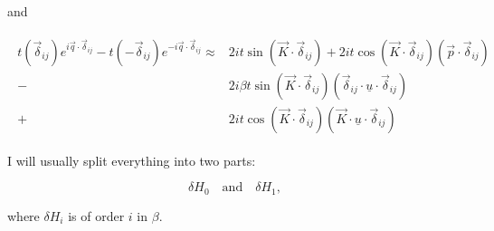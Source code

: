 \documentclass[../../../main.tex]{subfiles}
\begin{document}
and 

\begin{align}
	\begin{split}
		t(\vec{\delta}_{ij})e^{i\vec{q}\cdot\vec{\delta}_{ij}}-t(-\vec{\delta}_{ij})e^{-i\vec{q}\cdot\vec{\delta}_{ij}} \approx & 2it \sin(\vec{K}\cdot\vec{\delta}_{ij}) +2it\cos(\vec{K}\cdot\vec{\delta}_{ij})\left(\vec{p}\cdot\vec{\delta}_{ij}\right) \\
		-&2i\beta t \sin(\vec{K}\cdot\vec{\delta}_{ij})\left(\vec{\delta}_{ij} \cdot \underline{u} \cdot \vec{\delta}_{ij}\right) \\
		+&2it\cos(\vec{K}\cdot\vec{\delta}_{ij})\left(\vec{K}\cdot \underline{u} \cdot \vec{\delta}_{ij}\right)
	\end{split}
\end{align}

I will usually split everything into two parts:

\begin{equation}
	\delta H_0 \quad \text{and} \quad \delta H_1,
\end{equation}

where $\delta H_i$ is of order $i$ in $\beta$.
\end{document}
